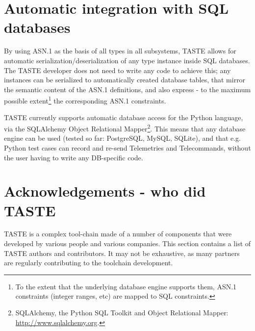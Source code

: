 \documentclass[11pt]{book}
\begin{document}
\section{Automatic integration with SQL databases}

By using ASN.1 as the basis of all types in all subsystems, TASTE allows for automatic serialization/deserialization of any type instance inside SQL databases. The TASTE developer does not need to write any code to achieve this; any instances can be serialized to automatically created database tables, that mirror the semantic content of the ASN.1 definitions, and also express -  to the maximum possible extent\footnote{To the extent that the underlying database engine supports them, ASN.1 constraints (integer ranges, etc) are mapped to SQL constraints.} the corresponding ASN.1 constraints.

TASTE currently supports automatic database access for the Python language, via the SQLAlchemy Object Relational Mapper\footnote{SQLAlchemy, the Python SQL Toolkit and Object Relational Mapper: \url{http://www.sqlalchemy.org}.}. This means that any database engine can be used (tested so far: PostgreSQL, MySQL, SQLite), and that e.g. Python test cases can record and re-send Telemetries and Telecommands, without the user having to write any DB-specific code.

\section{Acknowledgements - who did TASTE}
TASTE is a complex tool-chain made of a number of components that were developed by various people and various companies. This section contains a list of TASTE authors and contributors. It may not be exhaustive, as many partners are regularly contributing to the toolchain development. 
\end{document}
